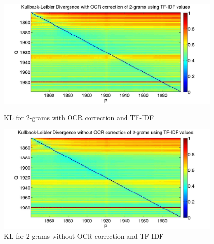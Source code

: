 \begin{figure}[H]
    \begin{minipage}[b]{0.48\linewidth}
        \includegraphics[scale=0.15]{Pictures/kullback-leibler/KL_2-grams_with_correction_tfidf.jpg}
        \caption{KL for 2-grams with OCR correction and TF-IDF}
        \label{KL-TC2}
    \end{minipage}\hfill
    \begin{minipage}[b]{0.5\linewidth}
        \includegraphics[scale=0.15]{Pictures/kullback-leibler/KL_2-grams_without_correction_tfidf.jpg}
        \caption{KL for 2-grams without OCR correction and TF-IDF}
        \label{KL-TN2}
    \end{minipage}\hfill
\end{figure}

